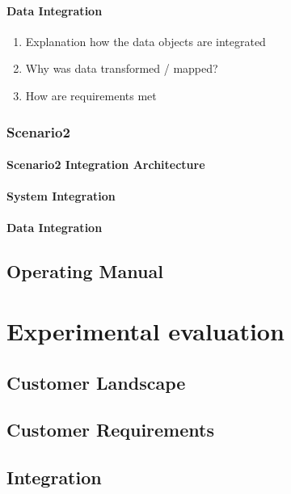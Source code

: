 \documentclass[
     12pt,         %
     a4paper,      %
     BCOR10mm,     %
     DIV14,        %
     ]{scrreprt}
\begin{document}
\subsubsection{Data Integration}
\begin{enumerate}
     \item Explanation how the data objects are integrated
     \item Why was data transformed / mapped?
     \item How are requirements met
\end{enumerate}

\subsection{Scenario2}

\subsubsection{Scenario2 Integration Architecture}

\subsubsection{System Integration}

\subsubsection{Data Integration}

\section{Operating Manual}

\chapter{Experimental evaluation}

\section{Customer Landscape}

\section{Customer Requirements}

\section{Integration}
\end{document}
